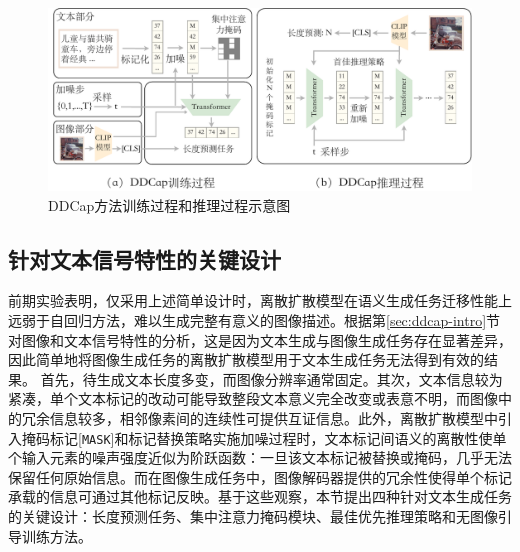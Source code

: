 \begin{figure}
  \centering
  \includegraphics[width=1.0\linewidth]{figures/ddcap-train-inference.pdf}
  \caption{DDCap方法训练过程和推理过程示意图}
  \label{fig:ddcap-train-inference}
\end{figure}

\subsection{针对文本信号特性的关键设计}
\label{sec:ddcap-key-design}
前期实验表明，仅采用上述简单设计时，离散扩散模型在语义生成任务迁移性能上远弱于自回归方法，难以生成完整有意义的图像描述。根据第\ref{sec:ddcap-intro}节对图像和文本信号特性的分析，这是因为文本生成与图像生成任务存在显著差异，因此简单地将图像生成任务的离散扩散模型用于文本生成任务无法得到有效的结果。
首先，待生成文本长度多变，而图像分辨率通常固定。其次，文本信息较为紧凑，单个文本标记的改动可能导致整段文本意义完全改变或表意不明，而图像中的冗余信息较多，相邻像素间的连续性可提供互证信息。此外，离散扩散模型中引入掩码标记[\texttt{MASK}]和标记替换策略实施加噪过程时，文本标记间语义的离散性使单个输入元素的噪声强度近似为阶跃函数：一旦该文本标记被替换或掩码，几乎无法保留任何原始信息。而在图像生成任务中，图像解码器提供的冗余性使得单个标记承载的信息可通过其他标记反映。基于这些观察，本节提出四种针对文本生成任务的关键设计：长度预测任务、集中注意力掩码模块、最佳优先推理策略和无图像引导训练方法。


